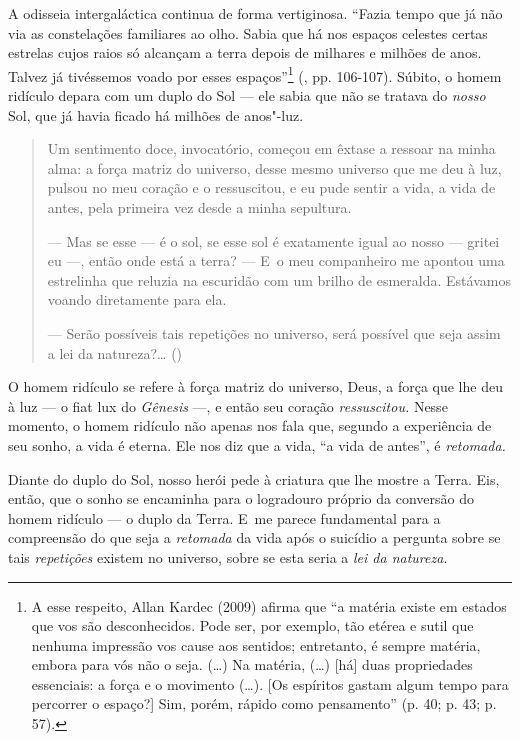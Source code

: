 A odisseia intergaláctica continua de forma vertiginosa. ``Fazia tempo
que já não via as constelações familiares ao olho. Sabia que há nos
espaços celestes certas estrelas cujos raios só alcançam a terra depois
de milhares e milhões de anos. Talvez já tivéssemos voado por esses
espaços''\footnote{A esse respeito, Allan Kardec (2009) afirma que ``a
  matéria existe em estados que vos são desconhecidos. Pode ser, por
  exemplo, tão etérea e sutil que nenhuma impressão vos cause aos
  sentidos; entretanto, é sempre matéria, embora para vós não o seja.
  (\ldots{}) Na matéria, (\ldots{}) {[}há{]} duas propriedades
  essenciais: a força e o movimento (\ldots{}). {[}Os espíritos gastam
  algum tempo para percorrer o espaço?{]} Sim, porém, rápido como
  pensamento'' (p. 40; p. 43; p. 57).} (, pp. 106-107). Súbito, o
homem ridículo depara com um duplo do Sol --- ele sabia que não se
tratava do \emph{nosso} Sol, que já havia ficado há milhões de anos"-luz.

\begin{quote}
Um sentimento doce, invocatório, começou em êxtase a ressoar na minha
alma: a força matriz do universo, desse mesmo universo que me deu à luz,
pulsou no meu coração e o ressuscitou, e eu pude sentir a vida, a vida
de antes, pela primeira vez desde a minha sepultura.

\noindent --- Mas se esse --- é o sol, se esse sol é exatamente igual ao nosso ---
gritei eu ---, então onde está a terra? --- E~o meu companheiro me apontou
uma estrelinha que reluzia na escuridão com um brilho de esmeralda.
Estávamos voando diretamente para ela.

\noindent --- Serão possíveis tais repetições no universo, será possível que seja
assim a lei da natureza?\ldots{} ()
\end{quote}

O homem ridículo se refere à força matriz do universo, Deus, a força que
lhe deu à luz --- o fiat lux do \emph{Gênesis} ---, e então seu coração
\emph{ressuscitou.} Nesse momento, o homem ridículo não apenas nos fala
que, segundo a experiência de seu sonho, a vida é eterna. Ele nos diz
que a vida, ``a vida de antes'', é \emph{retomada. }

Diante do duplo do Sol, nosso herói pede à criatura que lhe mostre a
Terra. Eis, então, que o sonho se encaminha para o logradouro próprio da
conversão do homem ridículo --- o duplo da Terra. E~me parece fundamental
para a compreensão do que seja a \emph{retomada} da vida após o suicídio
a pergunta sobre se tais \emph{repetições} existem no universo, sobre se
esta seria a \emph{lei da natureza}.

